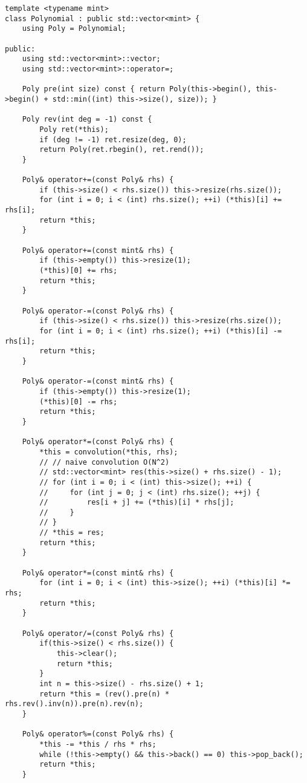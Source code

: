 \begin{lstlisting}
template <typename mint>
class Polynomial : public std::vector<mint> {
    using Poly = Polynomial;

public:
    using std::vector<mint>::vector;
    using std::vector<mint>::operator=;

    Poly pre(int size) const { return Poly(this->begin(), this->begin() + std::min((int) this->size(), size)); }

    Poly rev(int deg = -1) const {
        Poly ret(*this);
        if (deg != -1) ret.resize(deg, 0);
        return Poly(ret.rbegin(), ret.rend());
    }

    Poly& operator+=(const Poly& rhs) {
        if (this->size() < rhs.size()) this->resize(rhs.size());
        for (int i = 0; i < (int) rhs.size(); ++i) (*this)[i] += rhs[i];
        return *this;
    }

    Poly& operator+=(const mint& rhs) {
        if (this->empty()) this->resize(1);
        (*this)[0] += rhs;
        return *this;
    }

    Poly& operator-=(const Poly& rhs) {
        if (this->size() < rhs.size()) this->resize(rhs.size());
        for (int i = 0; i < (int) rhs.size(); ++i) (*this)[i] -= rhs[i];
        return *this;
    }

    Poly& operator-=(const mint& rhs) {
        if (this->empty()) this->resize(1);
        (*this)[0] -= rhs;
        return *this;
    }

    Poly& operator*=(const Poly& rhs) {
        *this = convolution(*this, rhs);
        // // naive convolution O(N^2)
        // std::vector<mint> res(this->size() + rhs.size() - 1);
        // for (int i = 0; i < (int) this->size(); ++i) {
        //     for (int j = 0; j < (int) rhs.size(); ++j) {
        //         res[i + j] += (*this)[i] * rhs[j];
        //     }
        // }
        // *this = res;
        return *this;
    }

    Poly& operator*=(const mint& rhs) {
        for (int i = 0; i < (int) this->size(); ++i) (*this)[i] *= rhs;
        return *this;
    }

    Poly& operator/=(const Poly& rhs) {
        if(this->size() < rhs.size()) {
            this->clear();
            return *this;
        }
        int n = this->size() - rhs.size() + 1;
        return *this = (rev().pre(n) * rhs.rev().inv(n)).pre(n).rev(n);
    }

    Poly& operator%=(const Poly& rhs) {
        *this -= *this / rhs * rhs;
        while (!this->empty() && this->back() == 0) this->pop_back();
        return *this;
    }


\end{lstlisting}

